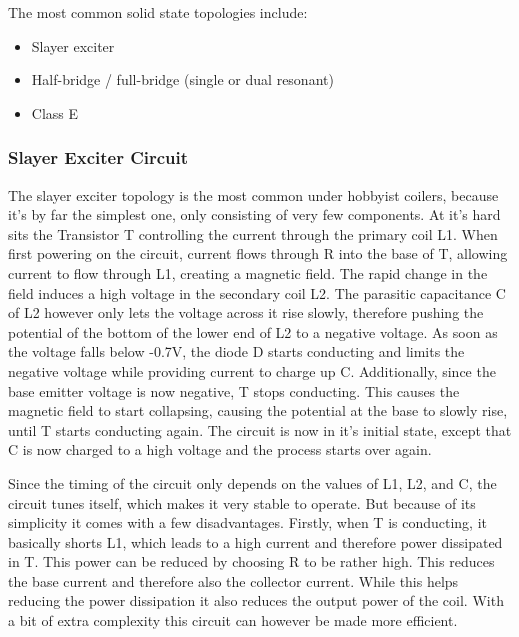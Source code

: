 The most common solid state topologies include:
\begin{itemize}
\item Slayer exciter
\item Half-bridge / full-bridge (single or dual resonant)
\item Class E
\end{itemize}

\subsubsection{Slayer Exciter Circuit}

The slayer exciter topology is the most common under hobbyist coilers, because it's by far the simplest one, only consisting of very few components. At it's hard sits the Transistor T controlling the current through the primary coil L1. When first powering on the circuit, current flows through R into the base of T, allowing current to flow through L1, creating a magnetic field. The rapid change in the field induces a high voltage in the secondary coil L2. The parasitic capacitance C of L2 however only lets the voltage across it rise slowly, therefore pushing the potential of the bottom of the lower end of L2 to a negative voltage. As soon as the voltage falls below -0.7V, the diode D starts conducting and limits the negative voltage while providing current to charge up C. Additionally, since the base emitter voltage is now negative, T stops conducting. This causes the magnetic field to start collapsing, causing the potential at the base to slowly rise, until T starts conducting again. The circuit is now in it's initial state, except that C is now charged to a high voltage and the process starts over again.

Since the timing of the circuit only depends on the values of L1, L2, and C, the circuit tunes itself, which makes it very stable to operate. But because of its simplicity it comes with a few disadvantages. Firstly, when T is conducting, it basically shorts L1, which leads to a high current and therefore power dissipated in T. This power can be reduced by choosing R to be rather high. This reduces the base current and therefore also the collector current. While this helps reducing the power dissipation it also reduces the output power of the coil. With a bit of extra complexity this circuit can however be made more efficient.

